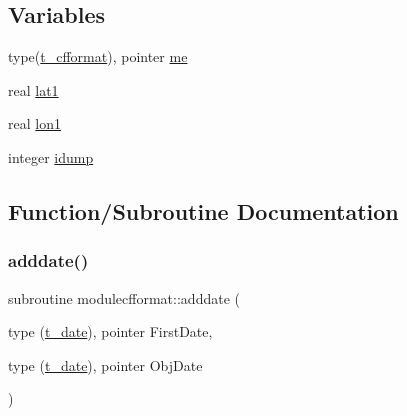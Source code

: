 \subsection*{Variables}
\begin{DoxyCompactItemize}
\item 
type(\mbox{\hyperlink{structmodulecfformat_1_1t__cfformat}{t\+\_\+cfformat}}), pointer \mbox{\hyperlink{namespacemodulecfformat_a76d190b893ca0f5aa943e57206a96b4b}{me}}
\item 
real \mbox{\hyperlink{namespacemodulecfformat_ab2d59020a88c3fbe79eff641f5173e89}{lat1}}
\item 
real \mbox{\hyperlink{namespacemodulecfformat_aadafc108edb5e219d2dd0fa0e0e650c4}{lon1}}
\item 
integer \mbox{\hyperlink{namespacemodulecfformat_ab5d33d2291e08b59db8c41277c58ea06}{idump}}
\end{DoxyCompactItemize}


\subsection{Function/\+Subroutine Documentation}
\mbox{\label{namespacemodulecfformat_ad6fa7957e7e1de3c2faa57ac769c05bd}} 
\subsubsection{\texorpdfstring{adddate()}{adddate()}}
{\footnotesize\ttfamily subroutine modulecfformat\+::adddate (\begin{DoxyParamCaption}\item[{type (\mbox{\hyperlink{structmodulecfformat_1_1t__date}{t\+\_\+date}}), pointer}]{First\+Date,  }\item[{type (\mbox{\hyperlink{structmodulecfformat_1_1t__date}{t\+\_\+date}}), pointer}]{Obj\+Date }\end{DoxyParamCaption})\hspace{0.3cm}{\ttfamily [private]}}

